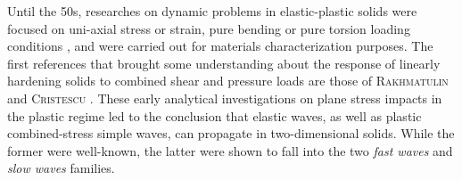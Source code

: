 Until the 50s, researches on dynamic problems in elastic-plastic solids were focused on uni-axial stress or strain, pure bending or pure torsion loading conditions \cite{Taylor,vonKarman}, and were carried out for materials characterization purposes.
The first references that brought some understanding about the response of linearly hardening solids to combined shear and pressure loads are those of \textsc{Rakhmatulin} \cite{Rakhmatulin} and \textsc{Cristescu} \cite{CRISTESCU19591605}.
These early analytical investigations on plane stress impacts in the plastic regime led to the conclusion that elastic waves, as well as plastic combined-stress simple waves, can propagate in two-dimensional solids. 
While the former were well-known, the latter were shown to fall into the two \textit{fast waves} and \textit{slow waves} families.

